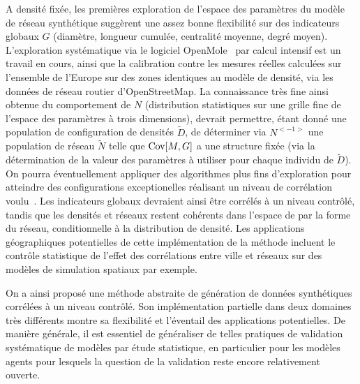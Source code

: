 A densité fixée, les premières exploration de l'espace des paramètres du modèle de réseau synthétique suggèrent une assez bonne flexibilité sur des indicateurs globaux $G$ (diamètre, longueur cumulée, centralité moyenne, degré moyen). L'exploration systématique via le logiciel OpenMole~\cite{reuillon2013openmole} par calcul intensif est un travail en cours, ainsi que la calibration contre les mesures réelles calculées sur l'ensemble de l'Europe sur des zones identiques au modèle de densité, via les données de réseau routier d'OpenStreetMap. La connaissance très fine ainsi obtenue du comportement de $N$ (distribution statistiques sur une grille fine de l'espace des paramètres à trois dimensions), devrait permettre, étant donné une population de configuration de densités $\tilde{D}$, de déterminer via $N^{<-1>}$ une population de réseau $\tilde{N}$ telle que $\operatorname{Cov}\!\left[M,G\right]$ a une structure fixée (via la détermination de la valeur des paramètres à utiliser pour chaque individu de $\tilde{D}$). On pourra éventuellement appliquer des algorithmes plus fins d'exploration pour atteindre des configurations exceptionelles réalisant un niveau de corrélation voulu~\cite{10.1371/journal.pone.0138212}. Les indicateurs globaux devraient ainsi être corrélés à un niveau contrôlé, tandis que les densités et réseaux restent cohérents dans l'espace de par la forme du réseau, conditionnelle à la distribution de densité. Les applications géographiques potentielles de cette implémentation de la méthode incluent le contrôle statistique de l'effet des corrélations entre ville et réseaux sur des modèles de simulation spatiaux par exemple.


\medskip

On a ainsi proposé une méthode abstraite de génération de données synthétiques corrélées à un niveau contrôlé. Son implémentation partielle dans deux domaines très différents montre sa flexibilité et l'éventail des applications potentielles. De manière générale, il est essentiel de généraliser de telles pratiques de validation systématique de modèles par étude statistique, en particulier pour les modèles agents pour lesquels la question de la validation reste encore relativement ouverte.





\footnotesize






